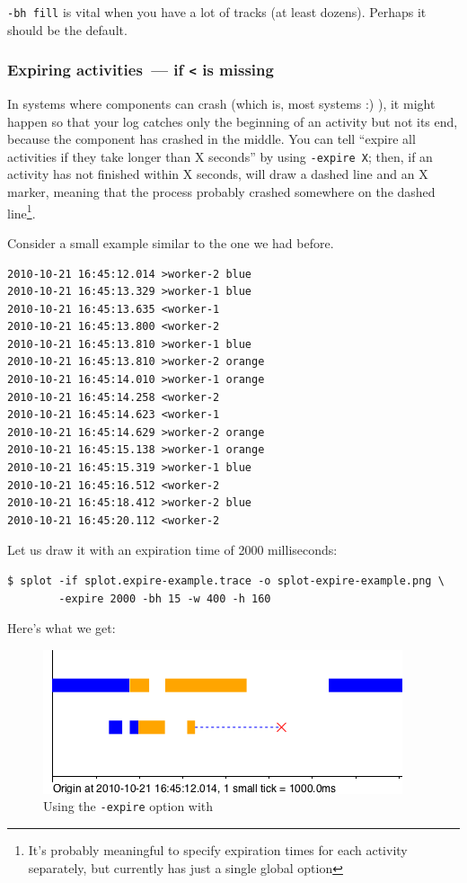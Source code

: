 \documentclass{article}
\begin{document}
\verb|-bh fill| is vital when you have a lot of tracks (at least dozens). Perhaps it should be the default.

\subsubsection{Expiring activities~--- if \texttt{<} is missing}

In systems where components can crash (which is, most systems :) ), it might happen so that your log catches only the beginning of an activity but not its end, because the component has crashed in the middle. You can tell \splot{} ``expire all activities if they take longer than X seconds'' by using \verb|-expire X|; then, if an activity has not finished within X seconds, \splot{} will draw a dashed line and an X marker, meaning that the process probably crashed somewhere on the dashed line\footnote{It's probably meaningful to specify expiration times for each activity separately, but currently \splot{} has just a single global option}.

Consider a small example similar to the one we had before.

\begin{verbatim}
2010-10-21 16:45:12.014 >worker-2 blue
2010-10-21 16:45:13.329 >worker-1 blue
2010-10-21 16:45:13.635 <worker-1
2010-10-21 16:45:13.800 <worker-2
2010-10-21 16:45:13.810 >worker-1 blue
2010-10-21 16:45:13.810 >worker-2 orange
2010-10-21 16:45:14.010 >worker-1 orange
2010-10-21 16:45:14.258 <worker-2
2010-10-21 16:45:14.623 <worker-1
2010-10-21 16:45:14.629 >worker-2 orange
2010-10-21 16:45:15.138 >worker-1 orange
2010-10-21 16:45:15.319 >worker-1 blue
2010-10-21 16:45:16.512 <worker-2
2010-10-21 16:45:18.412 >worker-2 blue
2010-10-21 16:45:20.112 <worker-2
\end{verbatim}

Let us draw it with an expiration time of 2000 milliseconds:

\begin{verbatim}
$ splot -if splot.expire-example.trace -o splot-expire-example.png \
        -expire 2000 -bh 15 -w 400 -h 160
\end{verbatim}

Here's what we get:

\begin{figure}[h!]
\center
\includegraphics[scale=0.5]{pics/splot/splot-expire-example.png}
\caption{Using the \texttt{-expire} option with \splot{}}
\end{figure}
\end{document}

